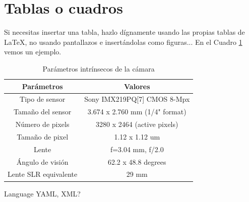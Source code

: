 \section{Tablas o cuadros}

Si necesitas insertar una tabla, hazlo dígnamente usando las propias tablas de
\LaTeX, no usando pantallazos e insertándolas como figuras... En el Cuadro
\ref{cuadro:ejemplo} vemos un ejemplo.

\begin{table}[H]
	\begin{center}
		\begin{tabular}{|c|c|}
			\hline
			\textbf{Parámetros}   & \textbf{Valores}
			\\
			\hline
			Tipo de sensor        & Sony IMX219PQ[7] CMOS 8-Mpx
			\\
			Tamaño del sensor     & 3.674 x 2.760 mm (1/4" format)
			\\
			Número de pixels      & 3280 x 2464 (active pixels)
			\\
			Tamaño de pixel       & 1.12 x 1.12 um
			\\
			Lente                 & f=3.04 mm, f/2.0
			\\
			Ángulo de visión      & 62.2 x 48.8 degrees
			\\
			Lente SLR equivalente & 29 mm
			\\
			\hline
		\end{tabular}
		\caption{Parámetros intrínsecos de la cámara}
		\label{cuadro:ejemplo}
	\end{center}
\end{table}


Language YAML, XML?